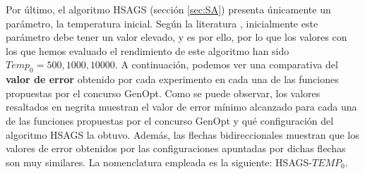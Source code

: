 Por último, el algoritmo HSAGS (sección \ref{sec:SA}) presenta únicamente un parámetro, la temperatura inicial. Según la literatura \cite{metabook}, inicialmente este parámetro debe tener un valor elevado, y es por ello, por lo que los valores con los que hemos evaluado el rendimiento de este algoritmo han sido $Temp_{0} = 500, 1000, 10000$. A continuación, podemos ver una comparativa del \textbf{valor de error} obtenido por cada experimento en cada una de las funciones propuestas por el concurso GenOpt. Como se puede observar, los valores resaltados en negrita muestran el valor de error mínimo alcanzado para cada una de las funciones propuestas por el concurso GenOpt y qué configuración del algoritmo HSAGS la obtuvo. Además, las flechas bidireccionales muestran que los valores de error obtenidos por las configuraciones apuntadas por dichas flechas son muy similares. La nomenclatura empleada es la siguiente: HSAGS-$TEMP_{0}$.

